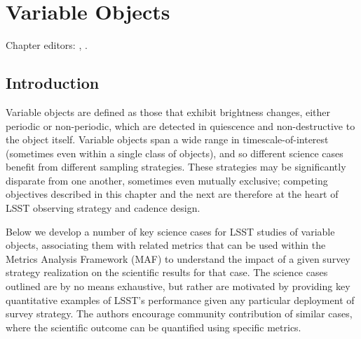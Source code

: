 
\chapter[Variable Objects]{Variable Objects}
\def\chpname{variables}\label{chp:\chpname}

Chapter editors:
,
.




\section{Introduction}

Variable objects are defined as those that exhibit brightness changes, either periodic or non-periodic, which are detected in quiescence and non-destructive to the object itself. Variable objects span a wide range in timescale-of-interest (sometimes even within a single class of objects), and so different science cases benefit from different sampling strategies. These strategies may be significantly disparate from one another, sometimes even mutually exclusive; competing objectives described in this chapter and the next are therefore at the heart of LSST observing strategy and cadence design.

Below we develop a number of key science cases for LSST studies of variable objects, associating them with related metrics that can be used within the Metrics Analysis Framework (MAF) to understand the impact of a given survey strategy realization on the scientific results for that case. The science cases outlined are by no means exhaustive, but rather are motivated by providing key quantitative examples of LSST's performance given any particular deployment of survey strategy. The authors encourage community contribution of similar cases, where the scientific outcome can be quantified using specific metrics.




